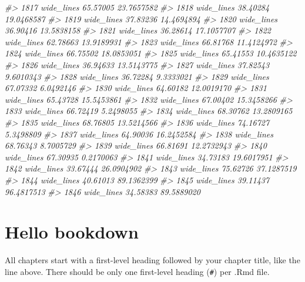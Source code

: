 \documentclass[
]{book}
\newenvironment{Shaded}{\begin{snugshade}}{\end{snugshade}}
\newcommand{\CommentTok}[1]{\textcolor[rgb]{0.56,0.35,0.01}{\textit{#1}}}
\theoremstyle{definition}
\theoremstyle{definition}
\theoremstyle{definition}
\theoremstyle{definition}
\theoremstyle{remark}
\begin{document}
\begin{Shaded}
\begin{Highlighting}[]
\CommentTok{\#\textgreater{} 1817 wide\_lines 65.57005 23.7657582}
\CommentTok{\#\textgreater{} 1818 wide\_lines 38.40284 19.0468587}
\CommentTok{\#\textgreater{} 1819 wide\_lines 37.83236 14.4694894}
\CommentTok{\#\textgreater{} 1820 wide\_lines 36.90416 13.5838158}
\CommentTok{\#\textgreater{} 1821 wide\_lines 36.28614 17.1057707}
\CommentTok{\#\textgreater{} 1822 wide\_lines 62.78663 13.9189931}
\CommentTok{\#\textgreater{} 1823 wide\_lines 66.81768 11.4124972}
\CommentTok{\#\textgreater{} 1824 wide\_lines 66.75502 18.0853051}
\CommentTok{\#\textgreater{} 1825 wide\_lines 65.41553 10.4635122}
\CommentTok{\#\textgreater{} 1826 wide\_lines 36.94633 13.5143775}
\CommentTok{\#\textgreater{} 1827 wide\_lines 37.82543  9.6010343}
\CommentTok{\#\textgreater{} 1828 wide\_lines 36.72284  9.3333021}
\CommentTok{\#\textgreater{} 1829 wide\_lines 67.07332  6.0492146}
\CommentTok{\#\textgreater{} 1830 wide\_lines 64.60182 12.0019170}
\CommentTok{\#\textgreater{} 1831 wide\_lines 65.43728 15.5453861}
\CommentTok{\#\textgreater{} 1832 wide\_lines 67.00402 15.3458266}
\CommentTok{\#\textgreater{} 1833 wide\_lines 66.72419  5.2498055}
\CommentTok{\#\textgreater{} 1834 wide\_lines 68.30762 13.2809165}
\CommentTok{\#\textgreater{} 1835 wide\_lines 68.76805 13.5214566}
\CommentTok{\#\textgreater{} 1836 wide\_lines 74.16727  5.3498809}
\CommentTok{\#\textgreater{} 1837 wide\_lines 64.90036 16.2452584}
\CommentTok{\#\textgreater{} 1838 wide\_lines 68.76343  8.7005729}
\CommentTok{\#\textgreater{} 1839 wide\_lines 66.81691 12.2732943}
\CommentTok{\#\textgreater{} 1840 wide\_lines 67.30935  0.2170063}
\CommentTok{\#\textgreater{} 1841 wide\_lines 34.73183 19.6017951}
\CommentTok{\#\textgreater{} 1842 wide\_lines 33.67444 26.0904902}
\CommentTok{\#\textgreater{} 1843 wide\_lines 75.62726 37.1287519}
\CommentTok{\#\textgreater{} 1844 wide\_lines 40.61013 89.1362399}
\CommentTok{\#\textgreater{} 1845 wide\_lines 39.11437 96.4817513}
\CommentTok{\#\textgreater{} 1846 wide\_lines 34.58383 89.5889020}
\end{Highlighting}
\end{Shaded}

\hypertarget{hello-bookdown}{%
\chapter{Hello bookdown}\label{hello-bookdown}}

All chapters start with a first-level heading followed by your chapter title, like the line above. There should be only one first-level heading (\texttt{\#}) per .Rmd file.
\end{document}
